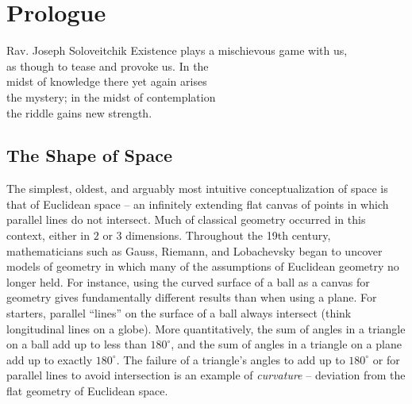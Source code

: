 \chapter*{Prologue}

\begin{epigraph}{19.5em}{Rav. Joseph Soloveitchik}
	Existence plays a mischievous game with us,\\
	as though to tease and provoke us. In the \\
	midst of knowledge there yet again arises \\
	the mystery; in the midst of contemplation\\
	the riddle gains new strength.
\end{epigraph}
%
\section*{The Shape of Space}

The simplest, oldest, and arguably most intuitive conceptualization of space is that of Euclidean space -- an infinitely extending flat canvas of points in which parallel lines do not intersect. Much of classical geometry occurred in this context, either in $2$ or $3$ dimensions.
Throughout the 19th century, mathematicians such as Gauss, Riemann, and Lobachevsky began to uncover models of geometry in which many of the assumptions of Euclidean geometry no longer held.
For instance, using the curved surface of a ball as a canvas for geometry gives fundamentally different results than when using a plane. For starters, parallel ``lines'' on the surface of a ball always intersect (think longitudinal lines on a globe).
More quantitatively, the sum of angles in a triangle on a ball add up to less than $180^\circ$, and the sum of angles in a triangle on a plane add up to exactly $180^\circ$. The failure of a triangle's angles to add up to $180^\circ$ or for parallel lines to avoid intersection is an example of \emph{curvature} -- deviation from the flat geometry of Euclidean space.

